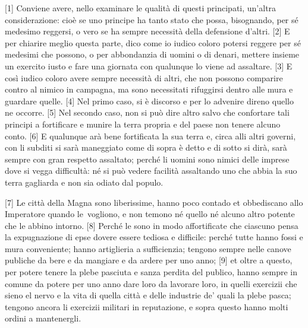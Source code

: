 {[}1{]} Conviene avere, nello examinare le qualità di questi principati,
un'altra considerazione: cioè se uno principe ha tanto stato che possa,
bisognando, per sé medesimo reggersi, o vero se ha sempre necessità
della defensione d'altri. {[}2{]} E per chiarire meglio questa parte,
dico come io iudico coloro potersi reggere per sé medesimi che possono,
o per abbondanzia di uomini o di denari, mettere insieme un exercito
iusto e fare una giornata con qualunque lo viene ad assaltare. {[}3{]} E
così iudico coloro avere sempre necessità di altri, che non possono
comparire contro al nimico in campagna, ma sono necessitati rifuggirsi
dentro alle mura e guardare quelle.
{[}4{]} Nel primo caso, si è discorso e per lo advenire direno quello ne
occorre. {[}5{]} Nel secondo caso, non si può dire altro salvo che
confortare tali principi a fortificare e munire la terra propria e del
paese non tenere alcuno conto. {[}6{]} E qualunque arà bene fortificata
la sua terra e, circa alli altri governi, con li subditi si sarà
maneggiato come di sopra è detto e di sotto si dirà, sarà sempre con
gran respetto assaltato; perché li uomini sono nimici delle imprese dove
si vegga difficultà: né si può vedere facilità assaltando uno che abbia
la suo terra gagliarda e non sia odiato dal populo.


{[}7{]} Le città della Magna sono liberissime, hanno poco contado et
obbediscano allo Imperatore quando le\est\ vogliono, e non temono né quello
né alcuno altro potente che le abbino intorno. {[}8{]} Perché le sono in
modo affortificate che ciascuno pensa la expugnazione di epse dovere
essere tediosa e difficile: perché tutte hanno fossi e mura conveniente;
hanno artiglieria a sufficienzia; tengono sempre nelle canove publiche
da bere e da mangiare e da ardere per uno anno; {[}9{]} et oltre a
questo, per potere tenere la plebe pasciuta e sanza perdita del publico,
hanno sempre in comune da potere per uno anno dare loro da lavorare
loro, in quelli exercizii che sieno el nervo e la vita di quella città e
delle industrie de' quali la plebe pasca; tengono ancora li exercizii
militari in reputazione, e sopra questo hanno molti ordini a
mantenergli.

